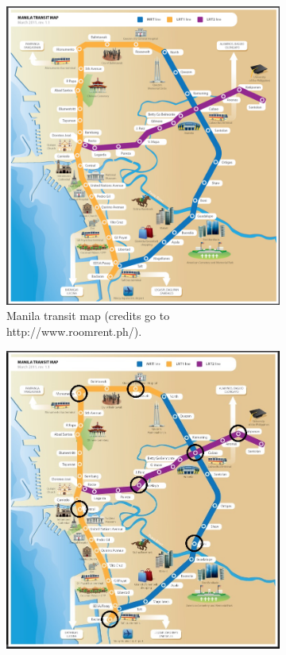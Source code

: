 \documentclass[a4paper]{article}
\begin{document}
\begin{figure}[H]
\centering
\begin{subfigure}[b]{0.3\textwidth} \includegraphics[width=\textwidth]{Manila-map}
\caption{Manila transit map (credits go to http://www.roomrent.ph/).}
\label{fig:map}
\end{subfigure} \quad     
\begin{subfigure}[b]{0.3\textwidth}
\includegraphics[width=\textwidth]{Manila-model_1}

\end{subfigure}
\end{figure}
\end{document}
